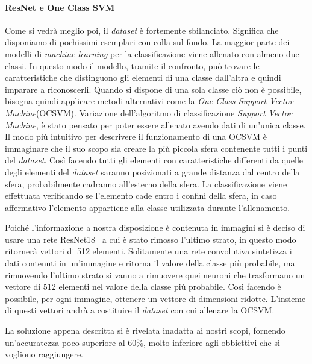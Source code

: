 \paragraph{ResNet e One Class SVM} %
Come si vedrà meglio poi, il \textit{dataset} è fortemente sbilanciato.
Significa che disponiamo di pochissimi esemplari con colla sul fondo.
La maggior parte dei modelli di \textit{machine learning} per la classificazione viene allenato con almeno due classi.
In questo modo il modello, tramite il confronto, può trovare le caratteristiche che distinguono gli elementi di una classe dall'altra e quindi imparare a riconoscerli.
Quando si dispone di una sola classe ciò non è possibile, bisogna quindi applicare metodi alternativi come la \textit{One Class Support Vector Machine}(OCSVM).
Variazione dell'algoritmo di classificazione \textit{Support Vector Machine}, è stato pensato per poter essere allenato avendo dati di un'unica classe.
Il modo più intuitivo per descrivere il funzionamento di una OCSVM è immaginare che il suo scopo sia creare la più piccola sfera contenente tutti i punti del \textit{dataset}.
Così facendo tutti gli elementi con caratteristiche differenti da quelle degli elementi del \textit{dataset} saranno posizionati a grande distanza dal centro della sfera, probabilmente cadranno all'esterno della sfera.
La classificazione viene effettuata verificando se l'elemento cade entro i confini della sfera, in caso affermativo l'elemento appartiene alla classe utilizzata durante l'allenamento.

Poiché l'informazione a nostra disposizione è contenuta in immagini si è deciso di usare una rete ResNet18~\cite{resnet} a cui è stato rimosso l'ultimo strato, in questo modo ritornerà vettori di 512 elementi.
Solitamente una rete convolutiva sintetizza i dati contenuti in un'immagine e ritorna il valore della classe più probabile, ma rimuovendo l'ultimo strato si vanno a rimuovere quei neuroni che trasformano un vettore di 512 elementi nel valore della classe più probabile. %
Così facendo è possibile, per ogni immagine, ottenere un vettore di dimensioni ridotte.
L'insieme di questi vettori andrà a costituire il \textit{dataset} con cui allenare la OCSVM.

La soluzione appena descritta si è rivelata inadatta ai nostri scopi, fornendo un'accuratezza poco superiore al 60\%, molto inferiore agli obbiettivi che si vogliono raggiungere.

